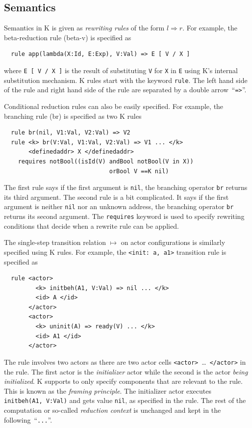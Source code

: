\documentclass{llncs}
\begin{document}
\subsection{Semantics}\label{sec:semantics}
Semantics in K is given as \emph{rewriting rules} of the form $l \Rightarrow r$.
For example, the  beta-reduction rule (beta-v) is specified as
\begin{verbatim}
  rule app(lambda(X:Id, E:Exp), V:Val) => E [ V / X ]
\end{verbatim}
where \texttt{E [ V / X ]} is the result of substituting \texttt{V} for 
\texttt{X} in \texttt{E} using K's internal substitution mechanism.
K rules start with the keyword \texttt{rule}. The left hand side of the rule 
and right hand side of the rule are separated by a double arrow~``\texttt{=>}''.

Conditional reduction rules can also be easily specified.
For example, the branching rule (br) is specified as two K rules
\begin{verbatim}
  rule br(nil, V1:Val, V2:Val) => V2
  rule <k> br(V:Val, V1:Val, V2:Val) => V1 ... </k>
       <definedaddr> X </definedaddr>
    requires notBool((isId(V) andBool notBool(V in X))
                              orBool V ==K nil)
\end{verbatim}
The first rule says if the first argument is \texttt{nil}, the branching 
operator \texttt{br} returns its third argument.
The second rule is a bit complicated.
It says if the first argument is neither \texttt{nil} nor an
unknown address, the branching operator \texttt{br} returns its second
argument.
The \texttt{requires} keyword is used to specify rewriting conditions that 
decide when a rewrite rule can be applied.

The single-step transition relation $\mapsto$ on actor configurations is 
similarly specified using K rules.
For example, the \texttt{<init: a, a1>} transition rule is specified as
\small
\begin{verbatim}
  rule <actor>
         <k> initbeh(A1, V:Val) => nil ... </k>
         <id> A </id>
       </actor>
       <actor>
         <k> uninit(A) => ready(V) ... </k>
         <id> A1 </id>
       </actor>
\end{verbatim}
\normalsize
The rule involves two actors as there are two actor cells 
\texttt{<actor>}\ \dots\ \texttt{</actor>} in the rule.
The first actor is the \emph{initializer} actor while the second is the actor 
\emph{being initialized}.
K supports to only specify components that are relevant to the rule. This is 
known as the \emph{framing principle}.
The initializer actor executes \texttt{initbeh(A1, V:Val)} and gets value 
\texttt{nil}, as specified in the rule.
The rest of the computation or so-called \emph{reduction context} is unchanged and
kept in 
the following~``\texttt{...}''.
\end{document}
